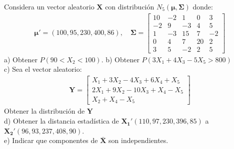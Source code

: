 \documentclass[12pt]{article}
\newenvironment{problem}[2][Problema]{\begin{trivlist}
\item[\hskip \labelsep {\bfseries #1}\hskip \labelsep {\bfseries #2.}]}{\end{trivlist}}
\begin{document}

\begin{problem}{1}
Considera un vector aleatorio $\mathbf{X}$ con distribución $N_5(\mathbf{\mu,\Sigma})$ donde:
\begin{align*}
\mathbf{\mu}' = (100,95,230,400,86), \quad \mathbf{\Sigma}=
\begin{bmatrix}
10 & -2 & 1 & 0 & 3 \\
-2 & 9 & -3 & 4 & 5 \\
1 & -3 & 15 & 7 & -2 \\
0 & 4 & 7 & 20 & 2 \\
3 & 5 & -2 & 2 & 5
\end{bmatrix}
\end{align*}
a) Obtener $P(90<X_2<100)$. b) Obtener $P(3X_1+4X_3-5X_5>800)$ \\
c) Sea el vector aleatorio:
\begin{align*}
\mathbf{Y}= \begin{bmatrix}
X_1+3X_2-4X_3+6X_4+X_5\\
2X_1+9X_2-10X_3+X_4-X_5\\
X_2+X_4-X_5
\end{bmatrix}
\end{align*}
Obtener la distribución de $\mathbf{Y}$\\
d) Obtener la distancia estadística de $\mathbf{X_1}'(110, 97, 230, 396, 85)$ a $\mathbf{X_2}'(96, 93, 237, 408, 90)$.\\
e) Indicar que componentes de $\mathbf{\bar{X}}$ son independientes.\\
\end{problem}
\end{document}

